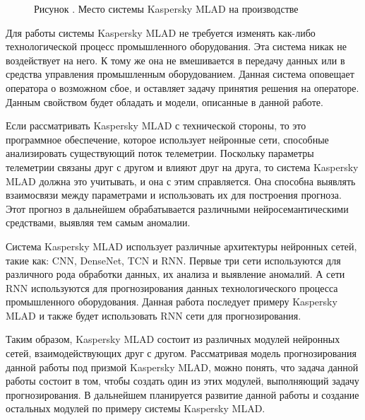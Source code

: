 {  \begin{figure}[H]
    \centering
    \def\svgwidth{\textwidth}
    
    \caption*{\gostFont Рисунок \thechaptercntr .\theimagecntr \spc {--} Место системы Kaspersky MLAD на производстве}
    \label{fig:MLADBlackBox}
  \end{figure} \addtocounter{imagecntr}{1}

  \par \redline Для работы системы Kaspersky MLAD не требуется изменять как-либо технологической процесс промышленного оборудования. Эта система никак не воздействует на него. К тому же она не вмешивается в передачу данных или в средства управления промышленным оборудованием. Данная система оповещает оператора о возможном сбое, и оставляет задачу принятия решения на операторе. Данным свойством будет обладать и модели, описанные в данной работе. 

  \par \redline Если рассматривать Kaspersky MLAD с технической стороны, то это программное обеспечение, которое использует нейронные сети, способные анализировать существующий поток телеметрии. Поскольку параметры телеметрии связаны друг с другом и влияют друг на друга, то система Kaspersky MLAD должна это учитывать, и она с этим справляется. Она способна выявлять взаимосвязи между параметрами и использовать их для построения прогноза. Этот прогноз в дальнейшем обрабатывается различными нейросемантическими средствами, выявляя тем самым аномалии. 

  \par \redline Система Kaspersky MLAD использует различные архитектуры нейронных сетей, такие как: CNN, DenseNet, TCN и RNN. Первые три сети используются для различного рода обработки данных, их анализа и выявление аномалий. А сети RNN используются для прогнозирования данных технологического процесса промышленного оборудования. Данная работа последует примеру Kaspersky MLAD и также будет использовать RNN сети для прогнозирования. 

  \par \redline Таким образом, Kaspersky MLAD состоит из различных модулей нейронных сетей, взаимодействующих друг с другом. Рассматривая модель прогнозирования данной работы под призмой Kaspersky MLAD, можно понять, что задача данной работы состоит в том, чтобы создать один из этих модулей, выполняющий задачу прогнозирования. В дальнейшем планируется развитие данной работы и создание остальных модулей по примеру системы Kaspersky MLAD.

}
